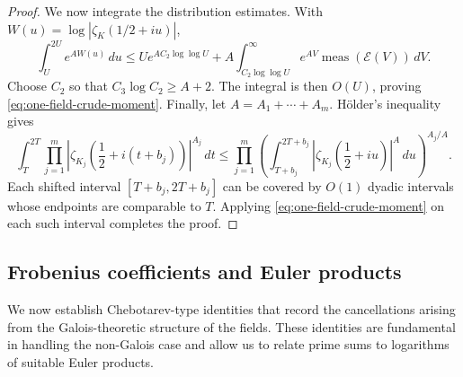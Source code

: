 \documentclass[twoside,reqno,11pt,a4paper]{amsart}
\numberwithin{equation}{section}
\theoremstyle{plain}
\theoremstyle{definition}
\theoremstyle{remark}
\renewcommand{\le}{\leqslant}
\renewcommand{\ge}{\geqslant}
\begin{document}
\begin{proof}
We now integrate the distribution estimates.  With $W(u)=\log|\zeta_K(1/2+iu)|$,
\begin{equation*}
        \int_U^{2U}e^{AW(u)}\,du
        \le
        Ue^{AC_2\log\log U}
        +A\int_{C_2\log\log U}^{\infty}
        e^{AV}\operatorname{meas}(\mathcal E(V))\,dV.
\end{equation*}
Choose $C_2$ so that $C_3\log C_2\ge A+2$.  The integral is then $O(U)$, proving \eqref{eq:one-field-crude-moment}.  Finally, let $A=A_1+\cdots+A_m$.  Hölder's inequality gives
\begin{equation*}
\int_T^{2T}\prod_{j=1}^m
\left|\zeta_{K_j}\left(\frac12+i(t+b_j)\right)\right|^{A_j}\,dt
\le
\prod_{j=1}^m
\left(
\int_{T+b_j}^{2T+b_j}
\left|\zeta_{K_j}\left(\frac12+iu\right)\right|^{A}\,du
\right)^{A_j/A}.
\end{equation*}
Each shifted interval $[T+b_j,2T+b_j]$ can be covered by $O(1)$ dyadic intervals whose endpoints are comparable to $T$.  Applying \eqref{eq:one-field-crude-moment} on each such interval completes the proof.
\end{proof}
	
	
\subsection{Frobenius coefficients and Euler products}
We now establish Chebotarev-type identities that record the cancellations arising from the Galois-theoretic structure of the fields. These identities are fundamental in handling the non-Galois case and allow us to relate prime sums to logarithms of suitable Euler products.
\end{document}

